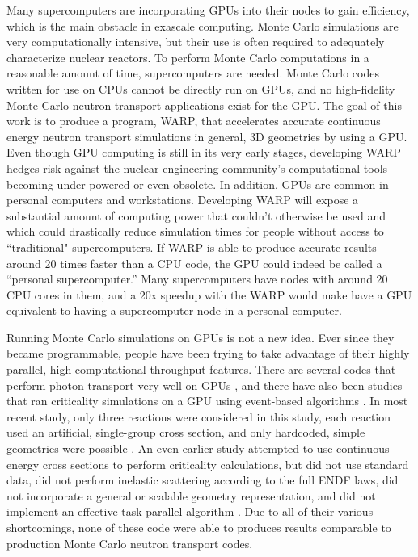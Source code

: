 Many supercomputers are incorporating GPUs into their nodes to gain efficiency, which is the main obstacle in exascale computing.  Monte Carlo simulations are very computationally intensive, but their use is often required to adequately characterize nuclear reactors.  To perform Monte Carlo computations in a reasonable amount of time, supercomputers are needed.  Monte Carlo codes written for use on CPUs cannot be directly run on GPUs, and no high-fidelity Monte Carlo neutron transport applications exist for the GPU.   The goal of this work is to produce a program, WARP, that accelerates accurate continuous energy neutron transport simulations in general, 3D geometries by using a GPU.  Even though GPU computing is still in its very early stages, developing WARP hedges risk against the nuclear engineering community's computational tools becoming under powered or even obsolete. In addition, GPUs are common in personal computers and workstations.  Developing WARP will expose a substantial amount of  computing power that couldn't otherwise be used and which could drastically reduce simulation times for people without access to ``traditional" supercomputers.  If WARP is able to produce accurate results around 20 times faster than a CPU code, the GPU could indeed be called a ``personal supercomputer.''   Many supercomputers have nodes with around 20 CPU cores in them, and a 20x speedup with the WARP would make have a GPU equivalent to having a supercomputer node in a personal computer.

Running Monte Carlo simulations on GPUs is not a new idea.  Ever since they became programmable, people have been trying to take advantage of their highly parallel, high computational throughput features.  There are several codes that perform photon transport very well on GPUs \cite{henderson}, and there have also been studies that ran criticality simulations on a GPU using event-based algorithms \cite{tianyu,tianyu_snamc,nelson}.  In most recent study, only three reactions were considered in this study, each reaction used an artificial, single-group cross section, and only hardcoded, simple geometries were possible \cite{tianyu,tianyu_snamc}.  An even earlier study attempted to use continuous-energy cross sections to perform criticality calculations, but did not use standard data, did not perform inelastic scattering according to the full ENDF laws, did not incorporate a general or scalable geometry representation, and did not implement an effective task-parallel algorithm \cite{nelson}.  Due to all of their various shortcomings, none of these code were able to produces results comparable to production Monte Carlo neutron transport codes.


